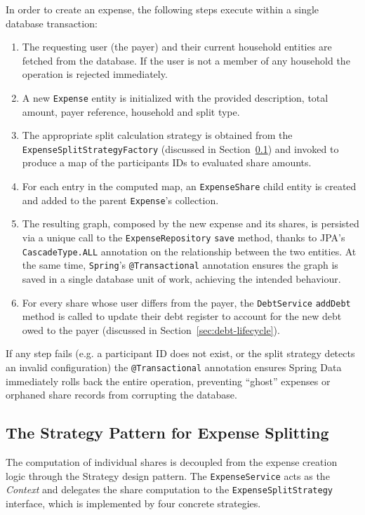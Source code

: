 In order to create an expense, the following steps execute within a single database transaction:
\begin{enumerate}
    \item The requesting user (the payer) and their current household entities are fetched from the database. If the user is not a member of any household the operation is rejected immediately.
    \item A new \texttt{Expense} entity is initialized with the provided description, total amount, payer reference, household and split type.
    \item The appropriate split calculation strategy is obtained from the\\\texttt{ExpenseSplitStrategyFactory} (discussed in Section~\ref{sec:strategy-pattern}) and invoked to produce a map of the participants IDs to evaluated share amounts.
    \item For each entry in the computed map, an \texttt{ExpenseShare} child entity is created and added to the parent \texttt{Expense}'s collection.
    \item The resulting graph, composed by the new expense and its shares, is persisted via a unique call to the \texttt{ExpenseRepository} \texttt{save} method, thanks to JPA's \texttt{CascadeType.ALL} annotation on the relationship between the two entities. At the same time, \texttt{Spring}'s \texttt{@Transactional} annotation ensures the graph is saved in a single database unit of work, achieving the intended behaviour.
    \item For every share whose user differs from the payer, the \texttt{DebtService} \texttt{addDebt} method is called to update their debt register to account for the new debt owed to the payer (discussed in Section~\ref{sec:debt-lifecycle}).
\end{enumerate}
If any step fails (e.g. a participant ID does not exist, or the split strategy detects an invalid configuration) the \texttt{@Transactional} annotation ensures Spring Data immediately rolls back the entire operation, preventing ``ghost'' expenses or orphaned share records from corrupting the database.

\subsection{The Strategy Pattern for Expense Splitting}
\label{sec:strategy-pattern}
The computation of individual shares is decoupled from the expense creation logic through the Strategy design pattern. The \texttt{ExpenseService} acts as the \textit{Context} and delegates the share computation to the \texttt{ExpenseSplitStrategy} interface, which is implemented by four concrete strategies.

